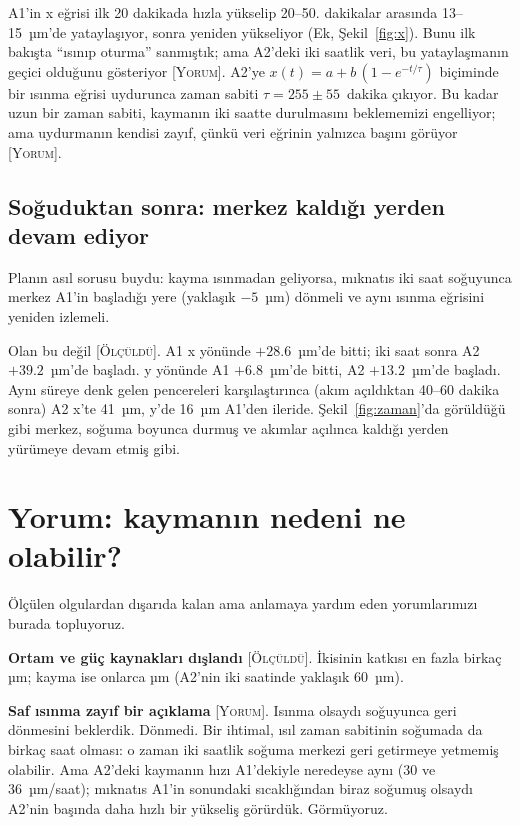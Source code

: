 \documentclass[11pt,a4paper]{article}
\newcommand{\olc}{\textsc{[Ölçüldü]}}
\newcommand{\yor}{\textsc{[Yorum]}}
\begin{document}
A1'in x eğrisi ilk 20 dakikada hızla yükselip 20--50. dakikalar arasında 13--15~µm'de yataylaşıyor, sonra
yeniden yükseliyor (Ek, Şekil~\ref{fig:x}). Bunu ilk bakışta ``ısınıp oturma'' sanmıştık; ama A2'deki
iki saatlik veri, bu yataylaşmanın geçici olduğunu gösteriyor \yor. A2'ye $x(t) = a + b\,(1 - e^{-t/\tau})$
biçiminde bir ısınma eğrisi uydurunca zaman sabiti $\tau = 255 \pm 55$~dakika çıkıyor. Bu kadar uzun bir
zaman sabiti, kaymanın iki saatte durulmasını beklememizi engelliyor; ama uydurmanın kendisi zayıf, çünkü
veri eğrinin yalnızca başını görüyor \yor.

\subsection{Soğuduktan sonra: merkez kaldığı yerden devam ediyor}
Planın asıl sorusu buydu: kayma ısınmadan geliyorsa, mıknatıs iki saat soğuyunca merkez A1'in başladığı
yere (yaklaşık $-5$~µm) dönmeli ve aynı ısınma eğrisini yeniden izlemeli.

Olan bu değil \olc. A1 x yönünde $+28.6$~µm'de bitti; iki saat sonra A2 $+39.2$~µm'de başladı. y yönünde
A1 $+6.8$~µm'de bitti, A2 $+13.2$~µm'de başladı. Aynı süreye denk gelen pencereleri karşılaştırınca
(akım açıldıktan 40--60 dakika sonra) A2 x'te 41~µm, y'de 16~µm A1'den ileride. Şekil~\ref{fig:zaman}'da
görüldüğü gibi merkez, soğuma boyunca durmuş ve akımlar açılınca kaldığı yerden yürümeye devam etmiş gibi.

\section{Yorum: kaymanın nedeni ne olabilir?}

Ölçülen olgulardan dışarıda kalan ama anlamaya yardım eden yorumlarımızı burada topluyoruz.

\textbf{Ortam ve güç kaynakları dışlandı} \olc. İkisinin katkısı en fazla birkaç µm; kayma ise onlarca µm (A2'nin iki saatinde yaklaşık 60~µm).

\textbf{Saf ısınma zayıf bir açıklama} \yor. Isınma olsaydı soğuyunca geri dönmesini beklerdik. Dönmedi.
Bir ihtimal, ısıl zaman sabitinin soğumada da birkaç saat olması: o zaman iki saatlik soğuma merkezi geri
getirmeye yetmemiş olabilir. Ama A2'deki kaymanın hızı A1'dekiyle neredeyse aynı (30 ve 36~µm/saat);
mıknatıs A1'in sonundaki sıcaklığından biraz soğumuş olsaydı A2'nin başında daha hızlı bir yükseliş
görürdük. Görmüyoruz.
\end{document}
